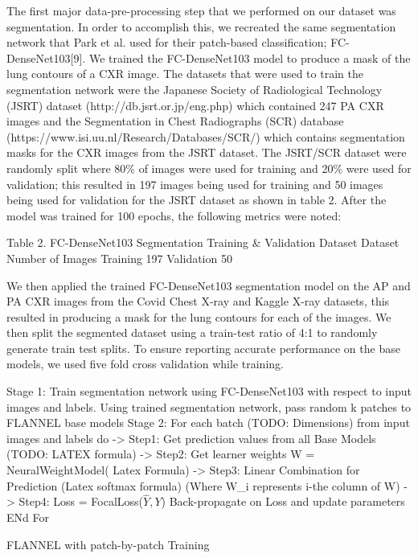 \documentclass{sigkddExp}
\begin{document}
The first major data-pre-processing step that we performed on our dataset was
segmentation. In order to accomplish this, we recreated the same segmentation
network that Park et al. used for their patch-based classification;
FC-DenseNet103[9]. We trained the FC-DenseNet103 model to produce a mask of the
lung contours of a CXR image. The datasets that were used to train the
segmentation network were the Japanese Society of Radiological Technology (JSRT)
dataset (http://db.jsrt.or.jp/eng.php) which contained 247 PA CXR images and the
Segmentation in Chest Radiographs (SCR) database
(https://www.isi.uu.nl/Research/Databases/SCR/)  which contains segmentation
masks for the CXR images from the JSRT dataset. The JSRT/SCR dataset were
randomly split where 80\% of images were used for training and 20\% were used for
validation; this resulted in 197 images being used for training and 50 images
being used for validation for the JSRT dataset as shown in table 2. After the
model was trained for 100 epochs, the following metrics were noted:


Table 2. FC-DenseNet103 Segmentation Training \& Validation Dataset Dataset
Number of Images Training 197 Validation 50


We then applied the trained FC-DenseNet103 segmentation model on the AP and PA CXR images from the Covid Chest X-ray and Kaggle X-ray datasets, this resulted in producing a mask for the lung contours for each of the images. We then split the segmented dataset using a train-test ratio of 4:1 to randomly generate train test splits. To ensure reporting accurate performance on the base models, we used five fold cross validation while training.


\begin{algorithm}
    \SetAlgoLined



    Stage 1:
    Train segmentation network using FC-DenseNet103 with respect to input images and labels.
    Using trained segmentation network, pass random k patches to FLANNEL base models
    Stage 2:
    For each batch (TODO: Dimensions) from input images and labels do
    -> Step1: Get prediction values from all Base Models
    (TODO: LATEX formula)
    -> Step2: Get learner weights
    W = NeuralWeightModel( Latex Formula)
    -> Step3: Linear Combination for Prediction
    (Latex softmax formula)
    (Where W\_i represents i-the column of W)
    -> Step4:
    Loss = FocalLoss($\hat{Y} , Y$)
    Back-propagate on Loss and update parameters
    ENd For
    \caption{FLANNEL with patch-by-patch Training}
\end{algorithm}
\end{document}

